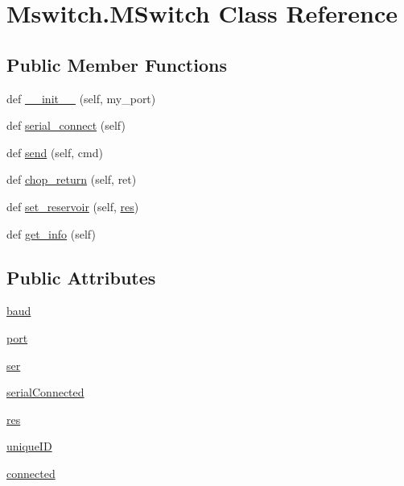 \hypertarget{class_mswitch_1_1_m_switch}{}\section{Mswitch.\+M\+Switch Class Reference}
\label{class_mswitch_1_1_m_switch}
\subsection*{Public Member Functions}
\begin{DoxyCompactItemize}
\item 
def \mbox{\hyperlink{class_mswitch_1_1_m_switch_a0fb0dfae18d749480c2f1951f8d33e7d}{\+\_\+\+\_\+init\+\_\+\+\_\+}} (self, my\+\_\+port)
\item 
def \mbox{\hyperlink{class_mswitch_1_1_m_switch_a1ea0e8470eaf51e2971ebbc55632b394}{serial\+\_\+connect}} (self)
\item 
def \mbox{\hyperlink{class_mswitch_1_1_m_switch_a5ed9dff363e8dcc66e12d6d9583ed491}{send}} (self, cmd)
\item 
def \mbox{\hyperlink{class_mswitch_1_1_m_switch_a7f9619b4aa0ad0e06121c6c52b13dca4}{chop\+\_\+return}} (self, ret)
\item 
def \mbox{\hyperlink{class_mswitch_1_1_m_switch_abc4ef313e6319d0d71197ffbed7be4c0}{set\+\_\+reservoir}} (self, \mbox{\hyperlink{class_mswitch_1_1_m_switch_a2e2a57856e19dcaf023a0e83a1fda604}{res}})
\item 
def \mbox{\hyperlink{class_mswitch_1_1_m_switch_a340f3cb2d10d8fc3681c6f215201d331}{get\+\_\+info}} (self)
\end{DoxyCompactItemize}
\subsection*{Public Attributes}
\begin{DoxyCompactItemize}
\item 
\mbox{\hyperlink{class_mswitch_1_1_m_switch_a3b1ad086eaa3a9a2bae7ad859b002e89}{baud}}
\item 
\mbox{\hyperlink{class_mswitch_1_1_m_switch_abd91d2bc2bc947ce10e54949b84abe0e}{port}}
\item 
\mbox{\hyperlink{class_mswitch_1_1_m_switch_a936eb8588d8a9b8d5f5219867b5ca952}{ser}}
\item 
\mbox{\hyperlink{class_mswitch_1_1_m_switch_a1dedffaf31ad772486347a9ceca3ccf2}{serial\+Connected}}
\item 
\mbox{\hyperlink{class_mswitch_1_1_m_switch_a2e2a57856e19dcaf023a0e83a1fda604}{res}}
\item 
\mbox{\hyperlink{class_mswitch_1_1_m_switch_ada61613dc2da7e94b2f0464a7479603e}{unique\+ID}}
\item 
\mbox{\hyperlink{class_mswitch_1_1_m_switch_ae6a23408cddf05b083bd28601aa49abf}{connected}}
\end{DoxyCompactItemize}


